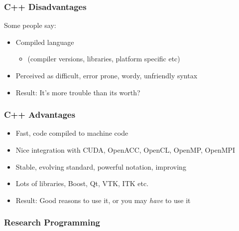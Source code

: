 \subsubsection{C++ Disadvantages}\label{c-disadvantages}

Some people say:

\begin{itemize}
\itemsep1pt\parskip0pt
\item
  Compiled language

  \begin{itemize}
  \itemsep1pt\parskip0pt
  \item
    (compiler versions, libraries, platform specific etc)
  \end{itemize}
\item
  Perceived as difficult, error prone, wordy, unfriendly syntax
\item
  Result: It's more trouble than its worth?
\end{itemize}

\subsubsection{C++ Advantages}\label{c-advantages}

\begin{itemize}
\itemsep1pt\parskip0pt
\item
  Fast, code compiled to machine code
\item
  Nice integration with CUDA, OpenACC, OpenCL, OpenMP, OpenMPI
\item
  Stable, evolving standard, powerful notation, improving
\item
  Lots of libraries, Boost, Qt, VTK, ITK etc.
\item
  Result: Good reasons to use it, or you may \emph{have} to use it
\end{itemize}

\subsubsection{Research Programming}\label{research-programming}

